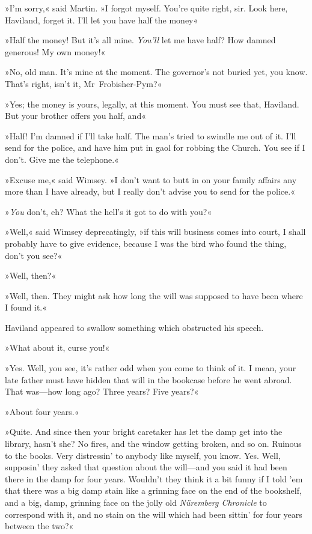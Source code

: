 »I'm sorry,« said Martin. »I forgot myself. You're quite right, sir. Look here, Haviland, forget it. I'll let you have half the money\longdash«

»Half the money! But it's all mine. \textit{You'll} let me have half? How damned generous! My own money!«

»No, old man. It's mine at the moment. The governor's not buried yet, you know. That's right, isn't it, Mr~Frobisher-Pym?«

»Yes; the money is yours, legally, at this moment. You must see that, Haviland. But your brother offers you half, and\longdash«

»Half! I'm damned if I'll take half. The man's tried to swindle me out of it. I'll send for the police, and have him put in gaol for robbing the Church. You see if I don't. Give me the telephone.«

»Excuse me,« said Wimsey. »I don't want to butt in on your family affairs any more than I have already, but I really don't advise you to send for the police.«

»\textit{You} don't, eh? What the hell's it got to do with you?«

»Well,« said Wimsey deprecatingly, »if this will business comes into court, I shall probably have to give evidence, because I was the bird who found the thing, don't you see?«

»Well, then?«

»Well, then. They might ask how long the will was supposed to have been where I found it.«

Haviland appeared to swallow something which obstructed his speech.

»What about it, curse you!«

»Yes. Well, you see, it's rather odd when you come to think of it. I mean, your late father must have hidden that will in the bookcase before he went abroad. That was—how long ago? Three years? Five years?«

»About four years.«

»Quite. And since then your bright caretaker has let the damp get into the library, hasn't she? No fires, and the window getting broken, and so on. Ruinous to the books. Very distressin' to anybody like myself, you know. Yes. Well, supposin' they asked that question about the will—and you said it had been there in the damp for four years. Wouldn't they think it a bit funny if I told 'em that there was a big damp stain like a grinning face on the end of the bookshelf, and a big, damp, grinning face on the jolly old \textit{Nüremberg Chronicle} to correspond with it, and no stain on the will which had been sittin' for four years between the two?«


